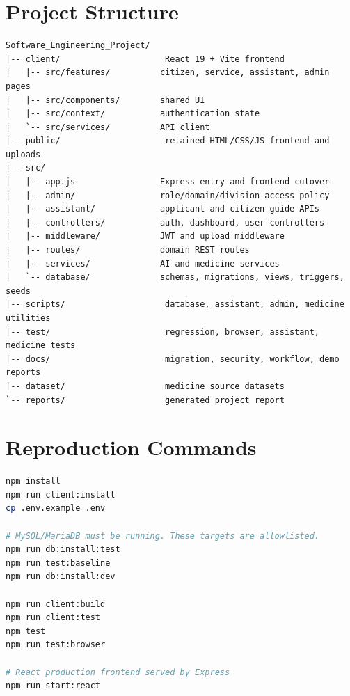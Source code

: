 \documentclass[12pt,a4paper,oneside]{report}
\begin{document}
\appendix

\chapter{Project Structure}

\begin{lstlisting}[language={},caption={Condensed current repository layout}]
Software_Engineering_Project/
|-- client/                     React 19 + Vite frontend
|   |-- src/features/          citizen, service, assistant, admin pages
|   |-- src/components/        shared UI
|   |-- src/context/           authentication state
|   `-- src/services/          API client
|-- public/                     retained HTML/CSS/JS frontend and uploads
|-- src/
|   |-- app.js                 Express entry and frontend cutover
|   |-- admin/                 role/domain/division access policy
|   |-- assistant/             applicant and citizen-guide APIs
|   |-- controllers/           auth, dashboard, user controllers
|   |-- middleware/            JWT and upload middleware
|   |-- routes/                domain REST routes
|   |-- services/              AI and medicine services
|   `-- database/              schemas, migrations, views, triggers, seeds
|-- scripts/                    database, assistant, admin, medicine utilities
|-- test/                       regression, browser, assistant, medicine tests
|-- docs/                       migration, security, workflow, demo reports
|-- dataset/                    medicine source datasets
`-- reports/                    generated project report
\end{lstlisting}

\chapter{Reproduction Commands}

\begin{lstlisting}[language=bash,caption={Local installation and verification commands}]
npm install
npm run client:install
cp .env.example .env

# MySQL/MariaDB must be running. These targets are allowlisted.
npm run db:install:test
npm run test:baseline
npm run db:install:dev

npm run client:build
npm run client:test
npm test
npm run test:browser

# React production frontend served by Express
npm run start:react
\end{lstlisting}
\end{document}
